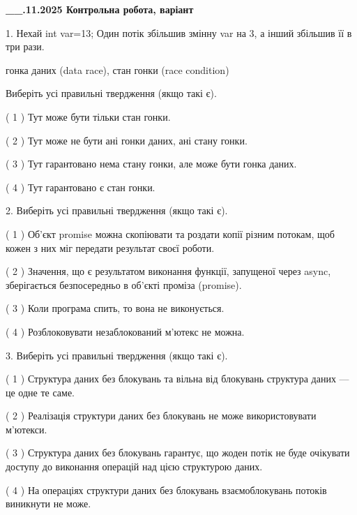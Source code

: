\documentclass[12pt, ukrainian]{article}
\begin{document}
\newpage
\begin {large}

\textbf{\_\_.11.2025 Контрольна робота, варіант  }\par


{
1. Нехай int var=13; Один потік збільшив змінну var на 3, а інший збільшив її в три рази.

гонка даних (data race), стан гонки (race condition)

Виберіть усі правильні твердження (якщо такі є).\par
\vspace{2mm}
( 1 ) Тут може бути тільки стан гонки.%

( 2 ) Тут може не бути ані гонки даних, ані стану гонки.%

( 3 ) Тут гарантовано нема стану гонки, але може бути гонка даних.%

( 4 ) Тут гарантовано є стан гонки.%


2. Виберіть усі правильні твердження (якщо такі є).\par
\vspace{2mm}

( 1 ) Об’єкт promise можна скопіювати та роздати копії різним потокам, щоб кожен з них міг передати результат своєї роботи.%

( 2 ) Значення, що є результатом виконання функції, запущеної через async, зберігається безпосередньо в об’єкті проміза (promise).%

( 3 ) Коли програма спить, то вона не виконується.%

( 4 ) Розблоковувати незаблокований м’ютекс не можна.%


3. Виберіть усі правильні твердження (якщо такі є).\par
\vspace{2mm}

( 1 ) Структура даних без блокувань та вільна від блокувань структура даних --- це одне те саме.%

( 2 ) Реалізація структури даних без блокувань не може використовувати м’ютекси.%

( 3 ) Структура даних без блокувань гарантує, що жоден потік не буде очікувати доступу до виконання операцій над цією структурою даних.%

( 4 ) На операціях структури даних без блокувань взаємоблокувань потоків виникнути не може.%


}
\end{large}
\end{document}
